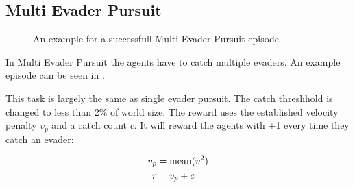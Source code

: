 \subsection{Multi Evader Pursuit}
\begin{figure}[htp]
    \centering
    \hspace{1cm}                       
    \caption{An example for a successfull Multi Evader Pursuit episode}
    \label{fig:multi_evader_example}
\end{figure}

In Multi Evader Pursuit the agents have to catch multiple evaders. An example episode can be seen in .\par

This task is largely the same as single evader pursuit. The catch threshhold is changed to less than 2\% of world size.
The reward uses the established velocity penalty $v_p$ and a catch count $c$. It will reward the agents with +1 every time they catch an evader:

\begin{equation} 
    \begin{aligned}
        v_p &= \textup{mean}(v^2)\\
        r &= v_p + c
    \end{aligned}
    \nonumber
\end{equation}